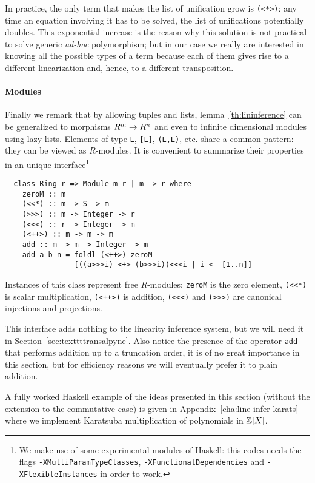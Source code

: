 In practice, the only term that makes the list of unification grow is
\lstinline{(<*>)}: any time an equation involving it has to be solved,
the list of unifications potentially doubles. This exponential
increase is the reason why this solution is not practical to solve
generic \emph{ad-hoc} polymorphism; but in our case we really are
interested in knowing all the possible types of a term because each of
them gives rise to a different linearization and, hence, to a
different transposition.

\paragraph{Modules}
\label{sec:modules}
Finally we remark that by allowing tuples and lists,
lemma~\ref{th:lininference} can be generalized to morphisms $R^m\rightarrow
R^n$ and even to infinite dimensional modules using lazy
lists. Elements of type \lstinline{L}, \lstinline{[L]},
\lstinline{(L,L)}, etc. share a common pattern: they can be viewed as
$R$-modules. It is convenient to summarize their properties in an
unique interface\footnote{We make use of some experimental modules of
  Haskell: this codes needs the flags
  \lstinline{-XMultiParamTypeClasses},
  \lstinline{-XFunctionalDependencies} and
  \lstinline{-XFlexibleInstances} in order to work.}
\begin{lstlisting}
  class Ring r => Module m r | m -> r where
    zeroM :: m
    (<<*) :: m -> S -> m
    (>>>) :: m -> Integer -> r
    (<<<) :: r -> Integer -> m
    (<++>) :: m -> m -> m
    add :: m -> m -> Integer -> m
    add a b n = foldl (<++>) zeroM
                [((a>>>i) <+> (b>>>i))<<<i | i <- [1..n]]
\end{lstlisting}

Instances of this class represent free $R$-modules: \lstinline{zeroM}
is the zero element, \lstinline{(<<*)} is scalar multiplication,
\lstinline{(<++>)} is addition, \lstinline{(<<<)} and
\lstinline{(>>>)} are canonical injections and projections.

This interface adds nothing to the linearity inference system, but we
will need it in Section~\ref{sec:texttttransalpyne}.  Also notice the
presence of the operator \lstinline{add} that performs addition up to
a truncation order, it is of no great importance in this section, but
for efficiency reasons we will eventually prefer it to plain addition.

A fully worked Haskell example of the ideas presented in this section
(without the extension to the commutative case) is given in
Appendix~\ref{cha:line-infer-karats} where we implement Karatsuba
multiplication of polynomials in $\mathbb{Z}[X]$.


%
